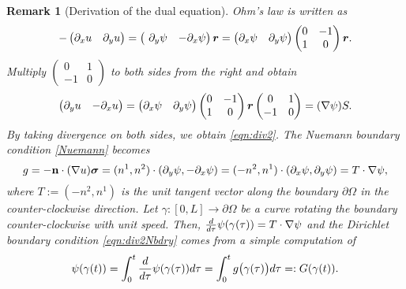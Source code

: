 \documentclass[11pt]{amsart}
\theoremstyle{plain}
\newtheorem{Rem}[Thm]{Remark}
\numberwithin{equation}{section}
\numberwithin{Thm}{section}
\def\r{{\bf r}}
\def\n{{\bf n}}
\def\Sigma{\mbox{\boldmath$\sigma$}}
\def\r{\mbox{\boldmath$r$}}
\begin{document}
\begin{Rem}[Derivation of the dual equation] Ohm's law is written as
\begin{equation}\label{Ohm}
-\begin{pmatrix} \partial_x u & \partial_y u \end{pmatrix}
=\begin{pmatrix}\ \partial_y \psi & -\partial_x \psi \end{pmatrix}\r
=\begin{pmatrix} \partial_x \psi &  \partial_y \psi \end{pmatrix}\begin{pmatrix} 0 & -1 \\ 1 & 0 \end{pmatrix}\r.
\end{equation}
Multiply $\begin{pmatrix} 0 & 1 \\ -1 & 0 \end{pmatrix}$ to both sides from the right and obtain
\begin{align*}
  \begin{pmatrix}\partial_y u &  -\partial_x u \end{pmatrix} =
\begin{pmatrix} \partial_x \psi &  \partial_y \psi \end{pmatrix}\begin{pmatrix} 0 & -1 \\ 1 & 0 \end{pmatrix}\r \begin{pmatrix} 0 & 1 \\ -1 & 0 \end{pmatrix}
= (\nabla\psi)S.
\end{align*}
By taking divergence on both sides, we obtain \eqref{eqn:div2}. The Nuemann boundary condition \eqref{Nuemann} becomes
$$
g = -\n\cdot(\nabla u)\Sigma = (n^1,n^2)\cdot (\partial_y \psi, -\partial_x \psi) =(-n^2,n^1)\cdot(\partial_x \psi,\partial_y \psi) = T\cdot\nabla \psi,
$$
where $T:=(-n^2,n^1)$ is the unit tangent vector along the boundary $\partial\Omega$ in the counter-clockwise direction. Let $\gamma: [0, L] \to \partial\Omega$ be a curve rotating the boundary counter-clockwise with unit speed. Then, ${d\over d\tau} \psi(\gamma(\tau))=T\cdot\nabla\psi$ and the Dirichlet boundary condition \eqref{eqn:div2Nbdry} comes from a simple computation of
$$
\psi(\gamma(t))=\int_0^t {d\over d\tau} \psi(\gamma(\tau)) d\tau = \int_0^t g\big(\gamma(\tau)\big) d\tau
=:G(\gamma(t)).
$$
\end{Rem}
\end{document}

